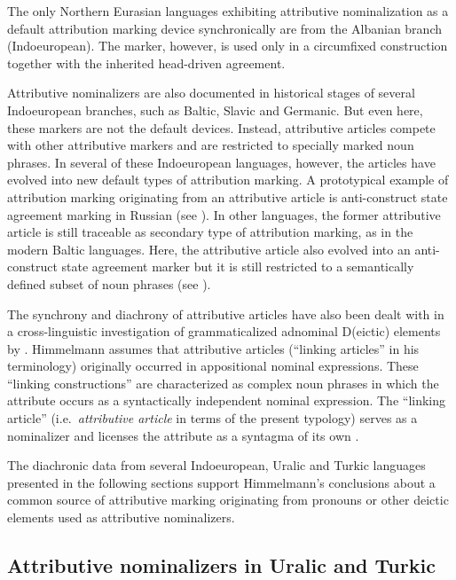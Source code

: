 The only Northern Eurasian languages exhibiting attributive nominalization as a default attribution marking device synchronically are from the Albanian branch (Indoeuropean). The marker, however,  is used only in a circumfixed construction together with the inherited head-driven agreement.

Attributive nominalizers are also documented in historical stages of several Indoeuropean branches, such as Baltic, Slavic and Germanic. But even here, these markers are not the default devices. Instead, attributive articles compete with other attributive markers and are restricted to specially marked noun phrases. In several of these Indoeuropean languages, however, the articles have evolved into new default types of attribution marking. A prototypical example of attribution marking originating from an attributive article is anti-construct state agreement marking in Russian (see ). In other languages, the former attributive article is still traceable as secondary type of attribution marking, as in the modern Baltic languages. Here, the attributive article also evolved into an anti-construct state agreement marker but it is still restricted to a semantically defined subset of noun phrases (see ). 

The synchrony and diachrony of attributive articles have also been dealt with in a cross-linguistic investigation of grammaticalized adnominal D(eictic) elements by \cite{himmelmann1997}. Himmelmann assumes that attributive articles (“linking articles” in his terminology) originally occurred in appositional nominal expressions. These “linking constructions” are characterized as complex noun phrases in which the attribute occurs as a syntactically independent nominal expression. The “linking article” (i.e.~\textit{attributive article} in terms of the present typology) serves as a nominalizer and licenses the attribute as a syntagma of its own \cite[188]{himmelmann1997}.

The diachronic data from several Indoeuropean, Uralic and Turkic languages presented in the following sections support Himmelmann's conclusions about a common source of attributive marking originating from pronouns or other deictic elements used as attributive nominalizers.

\subsection{Attributive nominalizers in Uralic and Turkic}\label{uralic-turkic diachr}

